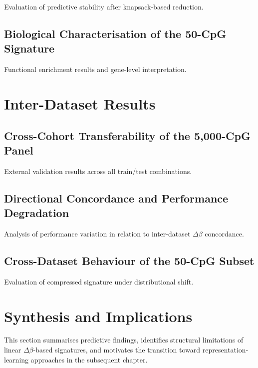 Evaluation of predictive stability after knapsack-based reduction.

\subsection{Biological Characterisation of the 50-CpG Signature}

Functional enrichment results and gene-level interpretation.

\section{Inter-Dataset Results}

\subsection{Cross-Cohort Transferability of the 5,000-CpG Panel}

External validation results across all train/test combinations.

\subsection{Directional Concordance and Performance Degradation}

Analysis of performance variation in relation to
inter-dataset $\Delta\beta$ concordance.

\subsection{Cross-Dataset Behaviour of the 50-CpG Subset}

Evaluation of compressed signature under distributional shift.

\section{Synthesis and Implications}

This section summarises predictive findings,
identifies structural limitations of linear
$\Delta\beta$-based signatures,
and motivates the transition toward
representation-learning approaches
in the subsequent chapter.